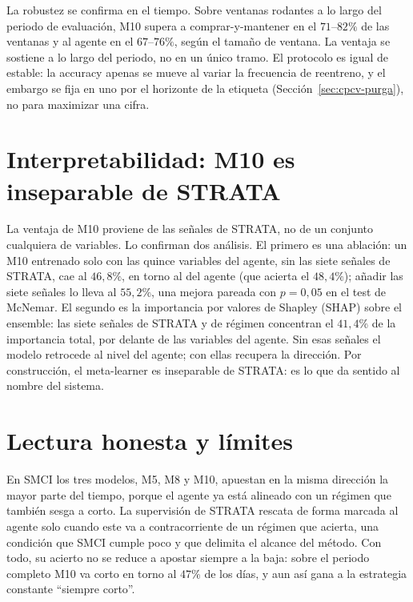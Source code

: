 La robustez se confirma en el tiempo. Sobre ventanas rodantes a lo largo del periodo de evaluación, M10 supera a comprar-y-mantener en el $71$--$82\%$ de las ventanas y al agente en el $67$--$76\%$, según el tamaño de ventana. La ventaja se sostiene a lo largo del periodo, no en un único tramo. El protocolo es igual de estable: la accuracy apenas se mueve al variar la frecuencia de reentreno, y el embargo se fija en uno por el horizonte de la etiqueta (Sección~\ref{sec:cpcv-purga}), no para maximizar una cifra.


\section{Interpretabilidad: M10 es inseparable de STRATA}
\label{sec:interpretabilidad}

La ventaja de M10 proviene de las señales de STRATA, no de un conjunto cualquiera de variables. Lo confirman dos análisis. El primero es una ablación: un M10 entrenado solo con las quince variables del agente, sin las siete señales de STRATA, cae al $46{,}8\%$, en torno al del agente (que acierta el $48{,}4\%$); añadir las siete señales lo lleva al $55{,}2\%$, una mejora pareada con $p = 0{,}05$ en el test de McNemar. El segundo es la importancia por valores de Shapley (SHAP) \cite{lundberg2017} sobre el ensemble: las siete señales de STRATA y de régimen concentran el $41{,}4\%$ de la importancia total, por delante de las variables del agente. Sin esas señales el modelo retrocede al nivel del agente; con ellas recupera la dirección. Por construcción, el meta-learner es inseparable de STRATA: es lo que da sentido al nombre del sistema.


\section{Lectura honesta y límites}
\label{sec:lectura}

En SMCI los tres modelos, M5, M8 y M10, apuestan en la misma dirección la mayor parte del tiempo, porque el agente ya está alineado con un régimen que también sesga a corto. La supervisión de STRATA rescata de forma marcada al agente solo cuando este va a contracorriente de un régimen que acierta, una condición que SMCI cumple poco y que delimita el alcance del método. Con todo, su acierto no se reduce a apostar siempre a la baja: sobre el periodo completo M10 va corto en torno al $47\%$ de los días, y aun así gana a la estrategia constante ``siempre corto''.

